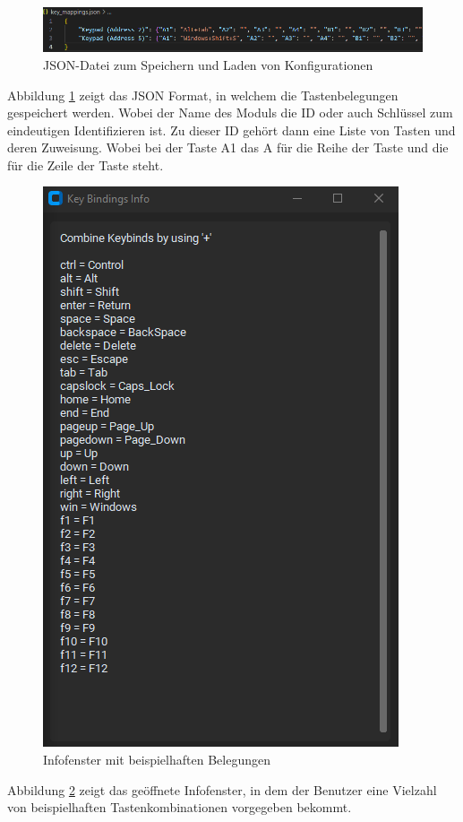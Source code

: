 \begin{figure}[H]
	\centering    
	\includegraphics[width=1\textwidth]{Bilder/Save file.png}
	\caption{JSON-Datei zum Speichern und Laden von Konfigurationen}
	\label{Mapper_savefile}
\end{figure}
Abbildung \ref{Mapper_savefile} zeigt das JSON Format, in welchem die Tastenbelegungen gespeichert werden. Wobei der Name des Moduls die ID oder auch \glqq Schlüssel\grqq{} zum eindeutigen Identifizieren ist. Zu dieser ID gehört dann eine Liste von Tasten und deren Zuweisung. Wobei bei der Taste \glqq A1\grqq{} das \glqq A\grqq{} für die Reihe der Taste und die \grqq{} für die Zeile der Taste steht.
\newpage
\begin{figure}[H]
	\centering    
	\includegraphics[width=.6\textwidth]{Bilder/Info_window.png}
	\caption{Infofenster mit beispielhaften Belegungen}
	\label{Mapper_info_window}
\end{figure}
Abbildung \ref{Mapper_info_window} zeigt das geöffnete Infofenster, in dem der Benutzer eine Vielzahl von beispielhaften Tastenkombinationen vorgegeben bekommt.